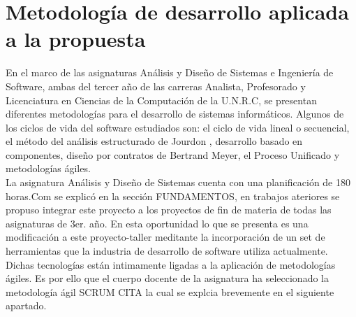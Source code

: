 \section{Metodología de desarrollo aplicada a la propuesta} \label{metodologia}
En el marco de las asignaturas Análisis y Diseño de Sistemas e Ingeniería de Software, ambas del tercer año de las carreras Analista, Profesorado y 
 Licenciatura en Ciencias de la Computación de la U.N.R.C, se presentan diferentes metodologías para el desarrollo de 
sistemas informáticos. Algunos de los ciclos de vida del software estudiados son:  el ciclo de vida lineal o secuencial, el método del análisis estructurado de Jourdon\cite{}
, desarrollo basado en componentes, diseño por contratos\cite{} de Bertrand Meyer, el Proceso Unificado \cite{} y metodologías ágiles.\\ 
 
La asignatura Análisis y Diseño de Sistemas cuenta con una planificación de 180 horas.Com se explicó en la sección FUNDAMENTOS, 
en trabajos ateriores se propuso
integrar este proyecto a los proyectos de fin de materia de todas las asignaturas de 3er. año. En esta oportunidad lo que se presenta es
una modificación a este proyecto-taller meditante la incorporación de un set de herramientas 
que la industria de desarrollo de software utiliza actualmente. Dichas tecnologías están intimamente ligadas a la aplicación de metodologías ágiles. 
Es por ello que el cuerpo docente de la asignatura ha seleccionado la metodología ágil SCRUM  CITA  la cual se explcia brevemente en el siguiente apartado.

